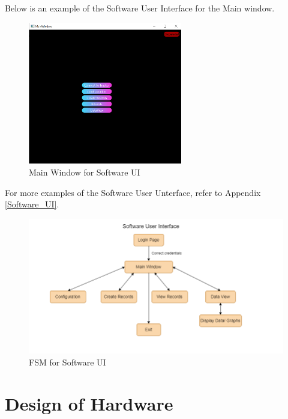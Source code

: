 \documentclass[12pt, titlepage]{article}
\begin{document}
Below is an example of the Software User Interface for the Main window.
\begin{figure}[H]
	\begin{center}
		 \includegraphics[width=0.6\textwidth]{MainWindow}
		\caption{Main Window for Software UI}
		\label{MainWindow} 
	\end{center}
\end{figure}

For more examples of the Software User Unterface, refer to Appendix \ref{Software_UI}.

\begin{figure}[H]
	\begin{center}
		 \includegraphics[width=1\textwidth]{SoftwareUI_FSM}
		\caption{FSM for Software UI}
		\label{SoftwareUI_FSM} 
	\end{center}
\end{figure}


\section{Design of Hardware}
\end{document}
